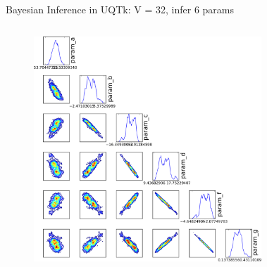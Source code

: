 \documentclass[10pt]{beamer}
\begin{document}
\begin{frame}{Bayesian Inference in UQTk: V = 32, infer 6 params}
	\begin{columns}[c]
			\begin{figure}
	 	 		\includegraphics[width=\textwidth]{v32chain}
	 		\end{figure} 	
	 		\begin{figure}[ht]
	 			\newline

\end{figure}
\end{columns}
\end{frame}
\end{document}
